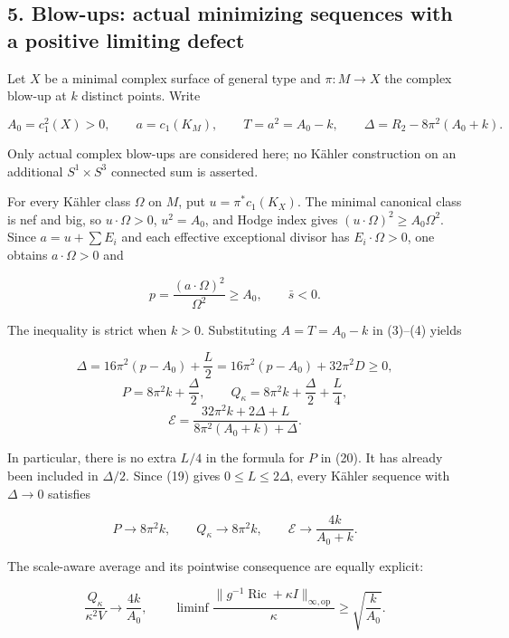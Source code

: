 \documentclass[
  11pt,
]{article}
\begin{document}
\hypertarget{blow-ups-actual-minimizing-sequences-with-a-positive-limiting-defect}{%
\subsection{5. Blow-ups: actual minimizing sequences with a positive
limiting
defect}\label{blow-ups-actual-minimizing-sequences-with-a-positive-limiting-defect}}

Let \(X\) be a minimal complex surface of general type and
\(\pi:M\to X\) the complex blow-up at \(k\) distinct points. Write

\[
 A_0=c_1^2(X)>0,\qquad a=c_1(K_M),\qquad
 T=a^2=A_0-k,\qquad
 \Delta=R_2-8\pi^2(A_0+k).
\]

Only actual complex blow-ups are considered here; no Kähler construction
on an additional \(S^1\times S^3\) connected sum is asserted.

For every Kähler class \(\Omega\) on \(M\), put \(u=\pi^*c_1(K_X)\). The
minimal canonical class is nef and big, so \(u\cdot\Omega>0\),
\(u^2=A_0\), and Hodge index gives \((u\cdot\Omega)^2\ge A_0\Omega^2\).
Since \(a=u+\sum E_i\) and each effective exceptional divisor has
\(E_i\cdot\Omega>0\), one obtains \(a\cdot\Omega>0\) and

\[
 p=\frac{(a\cdot\Omega)^2}{\Omega^2}\ge A_0,
 \qquad \bar s<0.
 \tag{18}
\]

The inequality is strict when \(k>0\). Substituting \(A=T=A_0-k\) in
(3)--(4) yields

\[
 \boxed{\Delta=16\pi^2(p-A_0)+\frac L2
                   =16\pi^2(p-A_0)+32\pi^2D\ge0,}
 \tag{19}
\] \[
 \boxed{P=8\pi^2k+\frac\Delta2,\qquad
 Q_\kappa=8\pi^2k+\frac\Delta2+\frac L4,}
 \tag{20}
\] \[
 \boxed{\mathcal E
 =\frac{32\pi^2k+2\Delta+L}{8\pi^2(A_0+k)+\Delta}.}
 \tag{21}
\]

In particular, there is no extra \(L/4\) in the formula for \(P\) in
(20). It has already been included in \(\Delta/2\). Since (19) gives
\(0\le L\le2\Delta\), every Kähler sequence with \(\Delta\to0\)
satisfies

\[
 P\to8\pi^2 k,\qquad
 Q_\kappa\to8\pi^2 k,\qquad
 \mathcal E\longrightarrow\frac{4k}{A_0+k}.
 \tag{22}
\]

The scale-aware average and its pointwise consequence are equally
explicit:

\[
 \frac{Q_\kappa}{\kappa^2V}\longrightarrow\frac{4k}{A_0},\qquad
 \liminf\frac{\|g^{-1}\operatorname{Ric}+\kappa I\|_{\infty,\mathrm{op}}}
 {\kappa}\ge\sqrt{\frac{k}{A_0}}.
 \tag{22a}
\]
\end{document}
